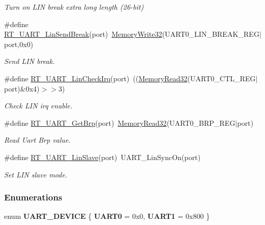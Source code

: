 \begin{DoxyCompactItemize}
\begin{DoxyCompactList}\small\item\em Turn on L\+IN break extra long length (26-\/bit) \end{DoxyCompactList}\item 
\#define \mbox{\hyperlink{a00056_ad1e6c13693e5ea54a55ce78635617178}{R\+T\+\_\+\+U\+A\+R\+T\+\_\+\+Lin\+Send\+Break}}(port)~\mbox{\hyperlink{a00020_ad9953f631a539cfaa35baf94f878b3ec}{Memory\+Write32}}(U\+A\+R\+T0\+\_\+\+L\+I\+N\+\_\+\+B\+R\+E\+A\+K\+\_\+\+R\+EG$\vert$port,0x0)
\begin{DoxyCompactList}\small\item\em Send L\+IN break. \end{DoxyCompactList}\item 
\#define \mbox{\hyperlink{a00056_a2e2715198f9716282584f34a7f472649}{R\+T\+\_\+\+U\+A\+R\+T\+\_\+\+Lin\+Check\+Irq}}(port)~((\mbox{\hyperlink{a00020_a706b02571285f92589fbb0b964d7d0bb}{Memory\+Read32}}(U\+A\+R\+T0\+\_\+\+C\+T\+L\+\_\+\+R\+EG$\vert$port)\&0x4)$>$$>$3)
\begin{DoxyCompactList}\small\item\em Check L\+IN irq enable. \end{DoxyCompactList}\item 
\#define \mbox{\hyperlink{a00056_a74f1bca1f0b60eeec1f84bcba3e34919}{R\+T\+\_\+\+U\+A\+R\+T\+\_\+\+Get\+Brp}}(port)~\mbox{\hyperlink{a00020_a706b02571285f92589fbb0b964d7d0bb}{Memory\+Read32}}(U\+A\+R\+T0\+\_\+\+B\+R\+P\+\_\+\+R\+EG$\vert$port)
\begin{DoxyCompactList}\small\item\em Read Uart Brp value. \end{DoxyCompactList}\item 
\#define \mbox{\hyperlink{a00056_a3f9518fa74ec401803fe1d15e0d39ff2}{R\+T\+\_\+\+U\+A\+R\+T\+\_\+\+Lin\+Slave}}(port)~U\+A\+R\+T\+\_\+\+Lin\+Sync\+On(port)
\begin{DoxyCompactList}\small\item\em Set L\+IN slave mode. \end{DoxyCompactList}\end{DoxyCompactItemize}
\subsubsection*{Enumerations}
\begin{DoxyCompactItemize}
\item 
\mbox{\label{a00056_a700933f5613c8346ce78b2362c55c7eb}} 
enum {\bfseries U\+A\+R\+T\+\_\+\+D\+E\+V\+I\+CE} \{ {\bfseries U\+A\+R\+T0} = 0x0, 
{\bfseries U\+A\+R\+T1} = 0x800
 \}
\end{DoxyCompactItemize}
